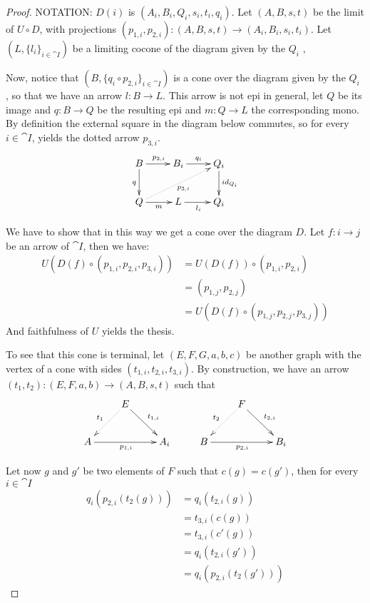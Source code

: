 \begin{proof} 
	NOTATION: $D(i)$ is $(A_i, B_i, Q_i, s_i, t_i, q_i)$.	Let $(A, B, s, t)$ be the limit of $U\circ D$, with projections $(p_{1,i}, p_{2,i})\colon (A,B, s,t)\to (A_i, B_i, s_i, t_i)$. Let $(L, \{l_i\}_{i\in \cat{I}})$ be a limiting cocone of the diagram given by the $Q_i$ , 
	
	Now, notice that $(B, \{q_i\circ p_{2,i}\}_{i\in \cat{I}})$ is a cone over the diagram given by the $Q_i$ , so that we have an arrow $l\colon B\to L$. This arrow is not epi in general, let $Q$ be its image and $q\colon B\to Q$ be the resulting epi and $m\colon Q\to L$ the corresponding mono.
	By definition the external square in the diagram below commutes, so for every $i\in \cat{I}$,  yields the dotted arrow $p_{3,i}$.
	\[\xymatrix{B \ar[r]^{p_{2,i}} \ar[d]_{q}& B_i \ar[r]^{q_i} & Q_i \ar[d]^{id_{Q_i}}\\ Q \ar[r]_{m} \ar@{.>}[urr]_{p_{3,i}}& L \ar[r]_{l_i} & Q_i}\]
	
	We have to show that in this way we get a cone over the diagram $D$. Let $f\colon i\to j$ be an arrow of $\cat{I}$, then we have:
	\begin{align*}
	U(D(f)\circ (p_{1,i}, p_{2, i}, p_{3,i}))&=U(D(f))\circ(p_{1,i}, p_{2, i})\\&=(p_{1,j}, p_{2, j})\\&= U(D(f)\circ (p_{1,j}, p_{2, j}, p_{3,j}))
	\end{align*}
	 And faithfulness of $U$ yields the thesis.
	 
	 
	 
	 
	 To see that this cone is terminal, let $(E, F, G, a, b, c)$ be another graph with the vertex of a cone with sides $(t_{1,i},t_{2, i}, t_{3,i})$. By construction, we have an arrow $(t_1, t_2)\colon (E, F, a, b)\to (A, B, s, t)$ such that
	 \[\xymatrix{&E \ar@{.>}[dl]_{t_1} \ar[dr]^{t_{1,i}}&&&F \ar@{.>}[dl]_{t_2} \ar[dr]^{t_{2,i}}\\ A \ar[rr]_{p_{1,i}} & & A_i & B \ar[rr]_{p_{2,i}}&& B_i }\]
	
	Let now $g$ and $g'$ be two elements of $F$ such that $c(g)=c(g')$, then for every $i\in \cat{I}$
	\begin{align*}
		q_i(p_{2,i}(t_2(g)))&=q_i(t_{2,i}(g))\\&=t_{3, i}(c(g))\\&=t_{3, i}(c'(g))\\&=q_i(t_{2,i}(g'))\\&=	q_i(p_{2,i}(t_2(g')))
	\end{align*}
	

\end{proof}
